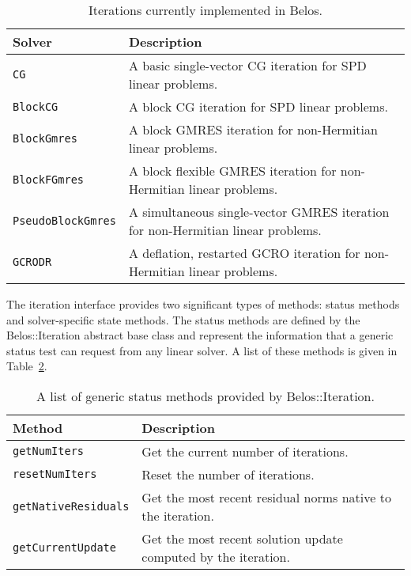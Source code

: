 \begin{table}[htp]
\begin{center}
\begin{tabular}{| p{4cm} p{10cm} |}
\hline
Solver & Description \\
\hline
{\tt CG}               & A basic single-vector CG iteration for SPD linear problems.\\
{\tt BlockCG}          & A block CG iteration for SPD linear problems. \\
{\tt BlockGmres}       & A block GMRES iteration for non-Hermitian linear problems. \\
{\tt BlockFGmres}      & A block flexible GMRES iteration for non-Hermitian linear problems. \\
{\tt PseudoBlockGmres} & A simultaneous single-vector GMRES iteration for non-Hermitian linear problems. \\
{\tt GCRODR }          & A deflation, restarted GCRO iteration for non-Hermitian linear problems. \\
\hline
\end{tabular}
\caption{Iterations currently implemented in Belos.}
\label{tab:belos:solvers}
\end{center}
\end{table}

The iteration interface provides two significant types of methods: status methods and
solver-specific state methods. The status methods are defined by the Belos::Iteration
abstract base class and represent the information that a generic status test can request
from any linear solver. A list of these methods is given in
Table~\ref{tab:belos:genstatusmethods}.

\begin{table}[htp]
\begin{center}
\begin{tabular}{| p{4cm} p{10cm} |}
\hline
Method & Description \\
\hline
{\tt getNumIters}       & Get the current number of iterations. \\
{\tt resetNumIters}     & Reset the number of iterations. \\
{\tt getNativeResiduals}& Get the most recent residual norms native to the iteration. \\
{\tt getCurrentUpdate}  & Get the most recent solution update computed by the iteration. \\
\hline
\end{tabular}
\caption{A list of generic status methods provided by Belos::Iteration.}
\label{tab:belos:genstatusmethods}
\end{center}
\end{table}

